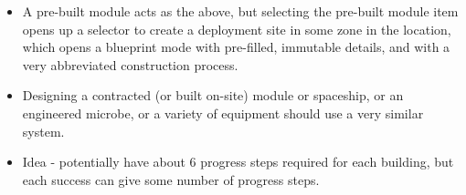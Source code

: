 \documentclass{article}
\begin{document}
\begin{itemize}
\begin{enumerate}
        \item During the end of the turn, checks should be rolled to make progress on the site, using up materials over time.
        \begin{itemize}
            \item It should be toggleable by a construction site whether these rolls will be shown to the player or automated. Whether they
                are shown should never affect the outcome.
            \item Minister theft can occur via either direct theft of materials, theft of wages of crew(s), and/or using a substandard
                amount of materials to create a slightly off-blueprint building and keeping the excess
        \end{itemize}
        \item Upon completion, the building is created where the site was, and the construction crew(s) are unattached.
    \end{enumerate}
    \item A pre-built module acts as the above, but selecting the pre-built module item opens up a selector to create a
        deployment site in some zone in the location, which opens a blueprint mode with pre-filled, immutable details, and with a
        very abbreviated construction process.
    \item Designing a contracted (or built on-site) module or spaceship, or an engineered microbe, or a variety of equipment should use a very similar system.
    \item Idea - potentially have about 6 progress steps required for each building, but each success can give some number of progress steps.
\end{itemize}
\end{document}
